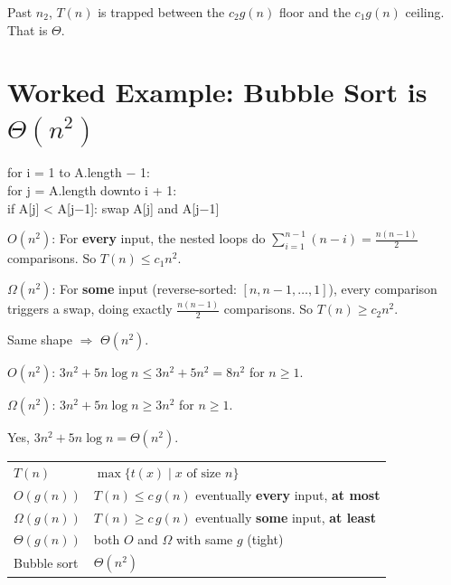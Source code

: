 \documentclass[11pt]{article}
\newcommand{\every}{\textcolor{greenO}{\textbf{every}}}
\newcommand{\atmost}{\textcolor{greenO}{\textbf{at most}}}
\newcommand{\some}{\textcolor{rustW}{\textbf{some}}}
\newcommand{\atleast}{\textcolor{rustW}{\textbf{at least}}}
\begin{document}
Past $n_2$, $T(n)$ is trapped between the \textcolor{rustW}{$c_2 g(n)$} floor and the \textcolor{greenO}{$c_1 g(n)$} ceiling. That is $\Theta$.

\section{Worked Example: Bubble Sort is $\Theta(n^2)$}

\begin{codebox}[BubbleSort(A)]
\ttfamily for i = 1 to A.length $-$ 1:\\
\ttfamily \hspace*{2em}for j = A.length downto i + 1:\\
\ttfamily \hspace*{4em}if A[j] < A[j$-$1]: swap A[j] and A[j$-$1]
\end{codebox}

\begin{keybox}[Bubble Sort: $T(n) = \Theta(n^2)$]
\textcolor{greenO}{$O(n^2)$:} For \every{} input, the nested loops do $\sum_{i=1}^{n-1}(n-i) = \frac{n(n-1)}{2}$ comparisons. So $T(n) \le c_1 n^2$.

\textcolor{rustW}{$\Omega(n^2)$:} For \some{} input (reverse-sorted: $[n, n{-}1, \ldots, 1]$), every comparison triggers a swap, doing exactly $\frac{n(n-1)}{2}$ comparisons. So $T(n) \ge c_2 n^2$.

Same shape $\Rightarrow$ $\Theta(n^2)$.
\end{keybox}

\begin{examplebox}
\textcolor{greenO}{$O(n^2)$:} $3n^2 + 5n\log n \le 3n^2 + 5n^2 = 8n^2$ for $n \ge 1$. \checkmark

\textcolor{rustW}{$\Omega(n^2)$:} $3n^2 + 5n\log n \ge 3n^2$ for $n \ge 1$. \checkmark

Yes, $3n^2 + 5n\log n = \Theta(n^2)$.
\end{examplebox}

\begin{keybox}
\renewcommand{\arraystretch}{1.35}
\begin{tabular}{l l}
$T(n)$ & $\max\{t(x) \mid x \text{ of size } n\}$ \\
\textcolor{greenO}{$O(g(n))$} & $T(n) \le c\,g(n)$ eventually \quad \every{} input, \atmost \\
\textcolor{rustW}{$\Omega(g(n))$} & $T(n) \ge c\,g(n)$ eventually \quad \some{} input, \atleast \\
\textcolor{violetT}{$\Theta(g(n))$} & both $O$ and $\Omega$ with same $g$ (tight) \\
Bubble sort & $\Theta(n^2)$ \\
\end{tabular}
\end{keybox}
\end{document}
